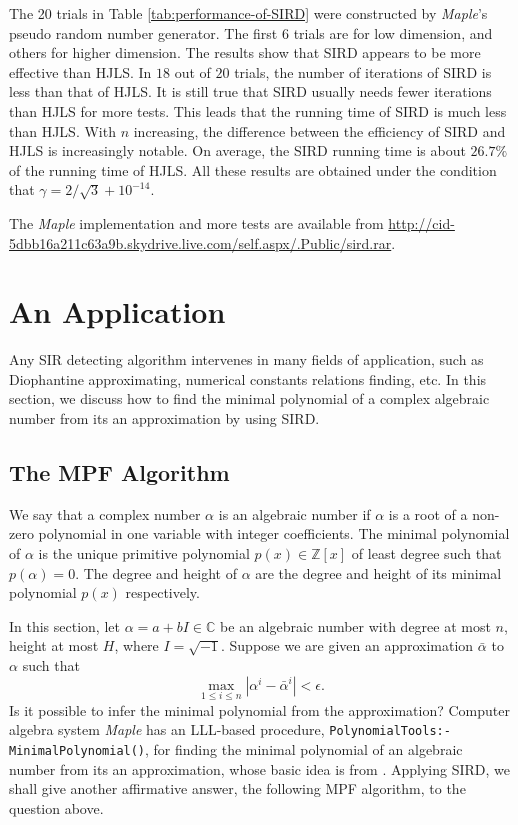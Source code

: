 \documentclass{sig-alternate}
\numberwithin{theorem}{section} \numberwithin{equation}{section}
\begin{document}
The 20 trials in Table \ref{tab:performance-of-SIRD} were
constructed by \emph{Maple}'s pseudo random number generator. The
first $6$ trials are for low dimension, and  others for higher
dimension. The results show that SIRD appears to be more effective
than HJLS. In $18$ out of $20$ trials, the number of iterations of
SIRD is less than that of HJLS. It is still true that SIRD usually
needs fewer iterations than  HJLS for more tests. This leads that
the running time of SIRD is much less than HJLS.  With $n$
increasing, the difference between the efficiency of SIRD and HJLS
is increasingly notable. On average, the SIRD running time is about
$26.7\%$ of the running time of HJLS. All these results are obtained
under the condition that $\gamma=2/\sqrt{3}+10^{-14}$.

The \emph{Maple} implementation and more tests are available from
{\tiny
\url{http://cid-5dbb16a211c63a9b.skydrive.live.com/self.aspx/.Public/sird.rar}.
}

\section{An Application}
\label{sec:finding-minimal-polynomial} Any SIR detecting algorithm
intervenes in many fields of application, such as Diophantine
approximating, numerical constants relations finding, etc. In this
section, we discuss how to find the minimal polynomial of a complex
algebraic number from its an approximation by using SIRD.
\subsection{The MPF Algorithm}
We say that a complex number $\alpha$ is an algebraic number if
$\alpha$ is a root of a non-zero polynomial in one variable with
integer coefficients. The minimal polynomial of $\alpha$ is the
unique primitive polynomial $p(x) \in \mathbb{Z}[x]$ of least degree
such that $p(\alpha)  = 0$. The degree and  height of $\alpha$ are
the degree and  height of its minimal polynomial $p(x)$
respectively.

In this section, let $\alpha = a + bI \in \mathbb{C}$ be an
algebraic number with degree at most $n$, height at most $H$, where $I = \sqrt{-1}$. Suppose we are given an approximation
$\bar{\alpha}$ to  $\alpha$ such that
\begin{equation}\label{eq:epsilon}\max_{1\leq i\leq
n}|\alpha^{i}-\bar{\alpha}^{i}| < \epsilon.\end{equation} Is it
possible to infer the minimal polynomial from the approximation?
Computer algebra system \emph{Maple} has an LLL-based procedure,
\texttt{PolynomialTools:-MinimalPolynomial()}, for finding the
minimal polynomial of an algebraic number from its an approximation,
whose
basic idea is from \cite{Sch1984, KLL1984, KLL1988}. Applying SIRD, we shall give another affirmative answer, the
following MPF algorithm, to the question above.
\end{document}
